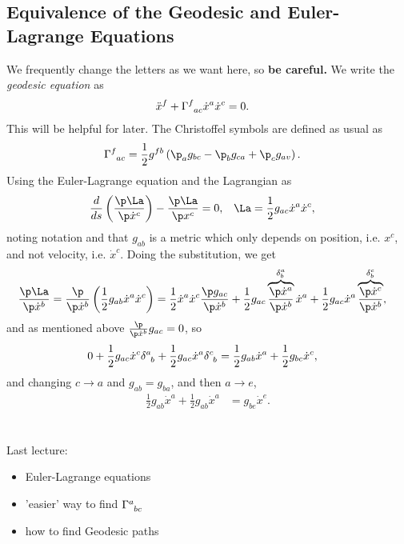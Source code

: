 \documentclass[a4paper, 11pt, normalem]{report}
\begin{document}
\section{Equivalence of the Geodesic and Euler-Lagrange Equations}
We frequently change the letters as we want here, so \textbf{be careful.}
We write the \emph{geodesic equation} as
\begin{align}
    \ddot{x}^f + \tensor{\Gamma}{^f_{ac}}\dot{x}^a\dot{x}^c &= 0.
\end{align}
This will be helpful for later. 
The Christoffel symbols are defined as usual as
\begin{align}
    \tensor{\Gamma}{^f_{ac}} &= \frac12g^{fb}\left(\p_ag_{bc}-\p_bg_{ca}+\p_cg_{av}\right). 
\end{align}
Using the Euler-Lagrange equation and the Lagrangian as
\begin{align}
    \frac{d}{ds}\left(\frac{\p\La}{\p\dot{x}^c}\right) - \frac{\p\La}{\p x^c} &= 0, & \La &= \frac12g_{ac}\dot{x}^a\dot{x}^c,
\end{align}
noting notation and that $g_{ab}$ is a metric which only depends on position, i.e. $x^c$, and not velocity, i.e. $\dot{x}^c$.
Doing the substitution, we get
\begin{align}
    \frac{\p\La}{\p\dot{x}^b} &= \frac{\p}{\p\dot{x}^b}\left(\frac12g_{ab}\dot{x}^a\dot{x}^c\right) = \frac12\dot{x}^a\dot{x}^c\frac{\p g_{ac}}{\p\dot{x}^b} + \frac12g_{ac}\overbrace{\frac{\p\dot{x}^a}{\p\dot{x}^b}}^{\delta^a_b}\dot{x}^a + \frac12g_{ac}\dot{x}^a\overbrace{\frac{\p\dot{x}^c}{\p\dot{x}^b}}^{\delta^c_b},
\end{align}
and as mentioned above $\frac{\p}{\p\dot{x}^b}g_{ac}=0$, so
\begin{align}
    0 + \frac12g_{ac}\dot{x}^c\tensor{\delta}{^a_b}+\frac12g_{ac}\dot{x}^a\tensor{\delta}{^c_b} &= \frac12g_{ab}\dot{x}^a+\frac12g_{bc}\dot{x}^c,
\end{align} 
and changing $c\to a$ and $g_{ab}=g_{ba}$, and then $a\to e$, 
\begin{align}
    \frac12g_{ab}\dot{x}^a+\frac12g_{ab}\dot{x}^a &= g_{be}\dot{x}^e.
\end{align}


\chapter{}
Last lecture:
\begin{itemize}
    \item Euler-Lagrange equations
    \item 'easier' way to find $\tensor{\Gamma}{^a_{bc}}$
    \item how to find Geodesic paths
\end{itemize}
\end{document}
